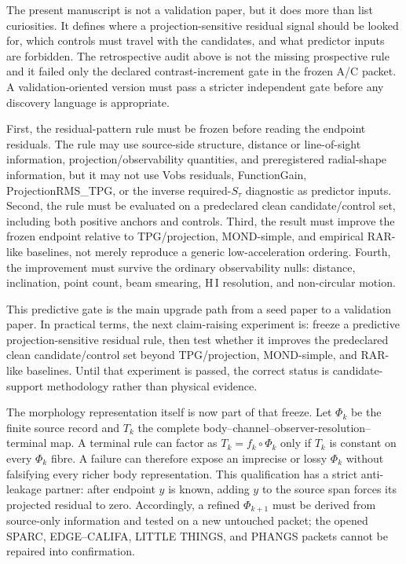 \documentclass[11pt]{article}
\begin{document}
The present manuscript is not a validation paper, but it does more than list curiosities. It defines where a projection-sensitive residual signal should be looked for, which controls must travel with the candidates, and what predictor inputs are forbidden. The retrospective audit above is not the missing prospective rule and it failed only the declared contrast-increment gate in the frozen A/C packet. A validation-oriented version must pass a stricter independent gate before any discovery language is appropriate.

First, the residual-pattern rule must be frozen before reading the endpoint residuals. The rule may use source-side structure, distance or line-of-sight information, projection/observability quantities, and preregistered radial-shape information, but it may not use Vobs residuals, FunctionGain, ProjectionRMS\_TPG, or the inverse required-$S_\tau$ diagnostic as predictor inputs. Second, the rule must be evaluated on a predeclared clean candidate/control set, including both positive anchors and controls. Third, the result must improve the frozen endpoint relative to TPG/projection, MOND-simple, and empirical RAR-like baselines, not merely reproduce a generic low-acceleration ordering. Fourth, the improvement must survive the ordinary observability nulls: distance, inclination, point count, beam smearing, H\,I resolution, and non-circular motion.

This predictive gate is the main upgrade path from a seed paper to a validation paper. In practical terms, the next claim-raising experiment is: freeze a predictive projection-sensitive residual rule, then test whether it improves the predeclared clean candidate/control set beyond TPG/projection, MOND-simple, and RAR-like baselines. Until that experiment is passed, the correct status is candidate-support methodology rather than physical evidence.

The morphology representation itself is now part of that freeze. Let $\Phi_k$ be the finite source record and $T_k$ the complete body--channel--observer-resolution--terminal map. A terminal rule can factor as $T_k=f_k\circ\Phi_k$ only if $T_k$ is constant on every $\Phi_k$ fibre. A failure can therefore expose an imprecise or lossy $\Phi_k$ without falsifying every richer body representation. This qualification has a strict anti-leakage partner: after endpoint $y$ is known, adding $y$ to the source span forces its projected residual to zero. Accordingly, a refined $\Phi_{k+1}$ must be derived from source-only information and tested on a new untouched packet; the opened SPARC, EDGE--CALIFA, LITTLE THINGS, and PHANGS packets cannot be repaired into confirmation.
\end{document}
